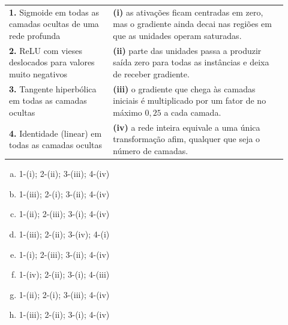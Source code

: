 \documentclass[11pt,a4paper]{article}
\begin{document}
\begin{enumerate}[1)]
\begin{center}
\begin{tabular}{p{0.34\linewidth} p{0.58\linewidth}}
\textbf{1.} Sigmoide em todas as camadas ocultas de uma rede profunda & \textbf{(i)} as ativações ficam centradas em zero, mas o gradiente ainda decai nas regiões em que as unidades operam saturadas. \\
\textbf{2.} ReLU com vieses deslocados para valores muito negativos & \textbf{(ii)} parte das unidades passa a produzir saída zero para todas as instâncias e deixa de receber gradiente. \\
\textbf{3.} Tangente hiperbólica em todas as camadas ocultas & \textbf{(iii)} o gradiente que chega às camadas iniciais é multiplicado por um fator de no máximo $0{,}25$ a cada camada. \\
\textbf{4.} Identidade (linear) em todas as camadas ocultas & \textbf{(iv)} a rede inteira equivale a uma única transformação afim, qualquer que seja o número de camadas. \\
\end{tabular}
\end{center}

\begin{minipage}[t]{0.47\linewidth}
\begin{enumerate}[a)]
    \item 1-(i); 2-(ii); 3-(iii); 4-(iv)
    \item 1-(iii); 2-(i); 3-(ii); 4-(iv)
    \item 1-(ii); 2-(iii); 3-(i); 4-(iv)
    \item 1-(iii); 2-(ii); 3-(iv); 4-(i)
\end{enumerate}
\end{minipage}\hfill
\begin{minipage}[t]{0.47\linewidth}
\begin{enumerate}[a)]
\setcounter{enumii}{4}
    \item 1-(i); 2-(iii); 3-(ii); 4-(iv)
    \item 1-(iv); 2-(ii); 3-(i); 4-(iii)
    \item 1-(ii); 2-(i); 3-(iii); 4-(iv)
    \item 1-(iii); 2-(ii); 3-(i); 4-(iv)
\end{enumerate}
\end{minipage}


\end{enumerate}
\end{document}
